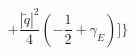 \begin{equation}
+\frac{|\widetilde{q}|^{2}}{4}\left(-\frac{1}{2}+\gamma_{E}\right)\biggr]\biggr\}
\end{equation}

